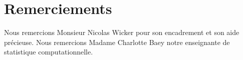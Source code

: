 \chapter*{Remerciements} 
Nous remercions Monsieur Nicolas Wicker pour son encadrement et son aide précieuse.
Nous remercions Madame Charlotte Baey notre enseignante de statistique computationnelle.

